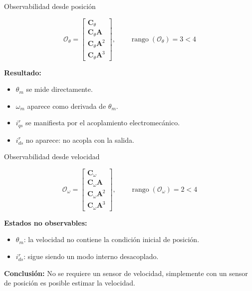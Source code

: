 \documentclass[aspectratio=169,t]{beamer}
\begin{document}
\begin{frame}{Observabilidad desde posición}
\vspace{3mm}

\begin{equation*}
\mathcal{O}_\theta=
\begin{bmatrix}
\bm{C}_\theta\\
\bm{C}_\theta\bm{A}\\
\bm{C}_\theta\bm{A}^2\\
\bm{C}_\theta\bm{A}^3
\end{bmatrix},
\qquad
\operatorname{rango}(\mathcal{O}_\theta)=3<4
\end{equation*}

\textbf{Resultado:}
\begin{itemize}
  \item $\theta_m$ se mide directamente.
  \item $\omega_m$ aparece como derivada de $\theta_m$.
  \item $i_{qs}^r$ se manifiesta por el acoplamiento electromecánico.
  \item $i_{ds}^{r}$ no aparece: no acopla con la salida.
\end{itemize}
\end{frame}

\begin{frame}{Observabilidad desde velocidad}
\vspace{3mm}

\begin{equation*}
\mathcal{O}_\omega=
\begin{bmatrix}
\bm{C}_\omega\\
\bm{C}_\omega\bm{A}\\
\bm{C}_\omega\bm{A}^2\\
\bm{C}_\omega\bm{A}^3
\end{bmatrix},
\qquad
\operatorname{rango}(\mathcal{O}_\omega)=2<4
\end{equation*}

\textbf{Estados no observables:}
\begin{itemize}
  \item $\theta_m$: la velocidad no contiene la condición inicial de posición.
  \item $i_{ds}^{r}$: sigue siendo un modo interno desacoplado.
\end{itemize}

\vspace{3mm}
{\small \textbf{Conclusión:} No se requiere un sensor de velocidad, simplemente con un sensor de posición es posible estimar la velocidad.}
\end{frame}
\end{document}

